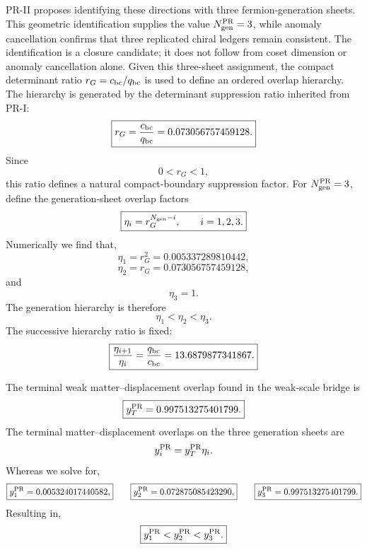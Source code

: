 \documentclass[11pt]{article}
\begin{document}
PR-II proposes identifying these directions with three fermion-generation sheets. This geometric identification supplies the value $N_{\rm gen}^{\rm PR}=3$, while anomaly cancellation confirms that
three replicated chiral ledgers remain consistent. The identification is a closure candidate; it does not follow from coset dimension or anomaly cancellation alone. Given this three-sheet assignment, the compact determinant ratio $r_G=c_{\rm bc}/q_{\rm bc}$ is used to define an ordered overlap hierarchy. The hierarchy is generated by the determinant suppression ratio inherited from PR-I:
\begin{equation}
\boxed{
r_G
=
\frac{c_{\rm bc}}{q_{\rm bc}}
=
0.073056757459128.
}
\end{equation}
Since
\begin{equation}
\boxed{
0<r_G<1,
}
\end{equation}
this ratio defines a natural compact-boundary suppression factor. For \(N_{\rm gen}^{\rm PR}=3\), define the generation-sheet overlap factors
\begin{equation}
\boxed{
\eta_i
=
r_G^{N_{\rm gen}-i},
\qquad
i=1,2,3.
}
\end{equation}
Numerically we find that,
\begin{equation}
\boxed{
\eta_1
=
r_G^2
=
0.005337289810442,
}
\end{equation}
\begin{equation}
\boxed{
\eta_2
=
r_G
=
0.073056757459128,
}
\end{equation}
and
\begin{equation}
\boxed{
\eta_3
=
1.
}
\end{equation}
The generation hierarchy is therefore
\begin{equation}
\boxed{
\eta_1<\eta_2<\eta_3.
}
\end{equation}
The successive hierarchy ratio is fixed:
\begin{equation}
\boxed{
\frac{\eta_{i+1}}{\eta_i}
=
\frac{q_{\rm bc}}{c_{\rm bc}}
=
13.6879877341867.
}
\end{equation}

The terminal weak matter--displacement overlap found in the weak-scale bridge is
\begin{equation}
\boxed{
y_T^{\rm PR}
=
0.997513275401799.
}
\end{equation}
The terminal matter--displacement overlaps on the three generation sheets are
\begin{equation}
y_i^{\rm PR}
=
y_T^{\rm PR}\eta_i.
\end{equation}
Whereas we solve for,
\begin{equation}
\boxed{
y_1^{\rm PR}
=
0.005324017440582,
}
\qquad
\boxed{
y_2^{\rm PR}
=
0.072875085423290,
}
\qquad
\boxed{
y_3^{\rm PR}
=
0.997513275401799.
}
\end{equation}
Resulting in,
\begin{equation}
\boxed{
y_1^{\rm PR}
<
y_2^{\rm PR}
<
y_3^{\rm PR}.
}
\end{equation}
\end{document}
